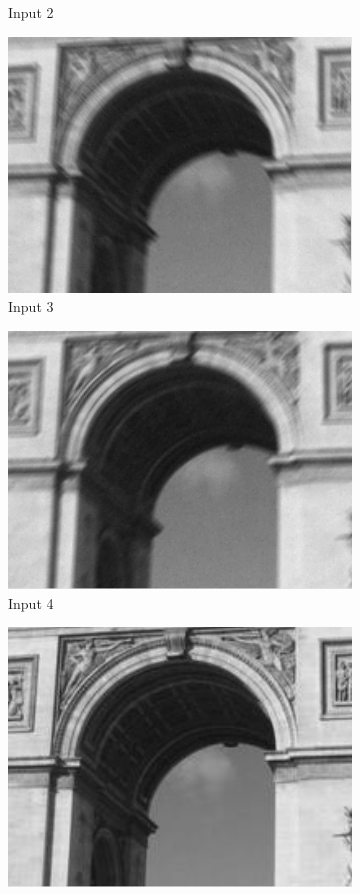 \documentclass[a4paper,10pt]{report}
\begin{document}
\begin{figure}[h]
\begin{subfigure}{0.24\textwidth}
\caption{Input 2}
\label{fig:Flou2}
\end{subfigure}
\begin{subfigure}{0.24\textwidth}
\includegraphics[width=0.9\linewidth]{ressource/detail_flou3.png}
\caption{Input 3}
\label{fig:Flou3}
\end{subfigure}
\begin{subfigure}{0.24\textwidth}
\includegraphics[width=0.9\linewidth]{ressource/detail_flou4.png}
\caption{Input 4}
\label{fig:Flou4}
\end{subfigure}
\begin{subfigure}{0.32\textwidth}
\includegraphics[width=0.9\linewidth]{ressource/detail_orig.png}

\end{subfigure}
\end{figure}
\end{document}
